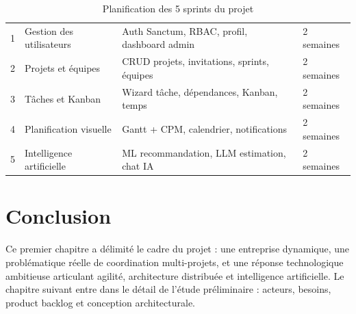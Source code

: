 \begin{table}[H]
  \centering
  \caption{Planification des 5 sprints du projet}
  \label{tab:sprints_planning}
  \begin{tabularx}{\textwidth}{C{1.5cm}L{4cm}X L{2.5cm}}
    \toprule
     &  &  &  \\
    \midrule
    1 & Gestion des utilisateurs & Auth Sanctum, RBAC, profil, dashboard admin & 2 semaines \\
    2 & Projets et équipes       & CRUD projets, invitations, sprints, équipes & 2 semaines \\
    3 & Tâches et Kanban         & Wizard tâche, dépendances, Kanban, temps    & 2 semaines \\
    4 & Planification visuelle   & Gantt + CPM, calendrier, notifications      & 2 semaines \\
    5 & Intelligence artificielle & ML recommandation, LLM estimation, chat IA & 2 semaines \\
    \bottomrule
  \end{tabularx}
\end{table}

\section*{Conclusion}

Ce premier chapitre a délimité le cadre du projet : une entreprise dynamique, une
problématique réelle de coordination multi-projets, et une réponse technologique
ambitieuse articulant agilité, architecture distribuée et intelligence artificielle.
Le chapitre suivant entre dans le détail de l'étude préliminaire : acteurs, besoins,
product backlog et conception architecturale.
